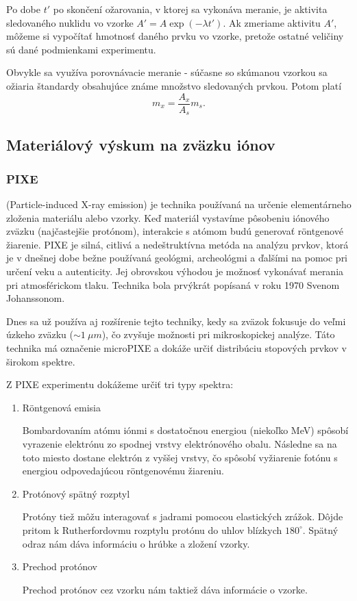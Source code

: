 \documentclass[../../main.tex]{subfiles}
\begin{document}
Po dobe $t'$ po skončení ožarovania, v ktorej sa vykonáva meranie, je aktivita sledovaného nuklidu vo vzorke $A'=A\exp(-\lambda t')$. Ak zmeriame aktivitu $A'$, môžeme si vypočítať hmotnosť daného prvku vo vzorke, pretože ostatné veličiny sú dané podmienkami experimentu.

Obvykle sa využíva porovnávacie meranie - súčasne so skúmanou vzorkou sa ožiaria štandardy obsahujúce známe množstvo sledovaných prvkou. Potom platí
\begin{equation}
m_x= \dfrac{A_x}{A_s}m_s.
\end{equation}

\subsection{Materiálový výskum na zväzku iónov}

\subsubsection{PIXE} (Particle-induced X-ray emission) je technika používaná na určenie elementárneho zloženia materiálu alebo vzorky. Keď materiál vystavíme pôsobeniu iónového zväzku (najčastejšie protónom), interakcie s atómom budú generovať r\"{o}ntgenové žiarenie. PIXE je silná, citlivá a nedeštruktívna metóda na analýzu prvkov, ktorá je v dnešnej dobe bežne používaná geológmi, archeológmi a ďalšími na pomoc pri určení veku a autenticity. Jej obrovskou výhodou je možnosť vykonávať merania pri atmosférickom tlaku. Technika bola prvýkrát popísaná v roku 1970 Svenom Johanssonom.

Dnes sa už používa aj rozšírenie tejto techniky, kedy sa zväzok fokusuje do veľmi úzkeho zväzku ($\sim 1\:\unit{\mu m}$), čo zvyšuje možnosti pri mikroskopickej analýze. Táto technika má označenie microPIXE a dokáže určiť distribúciu stopových prvkov v širokom spektre. 

Z PIXE experimentu dokážeme určiť tri typy spektra:
\begin{enumerate}
\item R\"{o}ntgenová emisia 

Bombardovaním atómu iónmi s dostatočnou energiou (niekoľko MeV) spôsobí vyrazenie elektrónu zo spodnej vrstvy elektrónového obalu. Následne sa na toto miesto dostane elektrón z vyššej vrstvy, čo spôsobí vyžiarenie fotónu s energiou odpovedajúcou r\"{o}ntgenovému žiareniu. 

\item Protónový spätný rozptyl

Protóny tiež môžu interagovať s jadrami pomocou elastických zrážok. Dôjde pritom k Rutherfordovmu rozptylu protónu do uhlov blízkych $180^\circ$. Spätný odraz nám dáva informáciu o hrúbke a zložení vzorky. 

\item Prechod protónov

Prechod protónov cez vzorku nám taktiež dáva informácie o vzorke. 
\end{enumerate}
\end{document}
